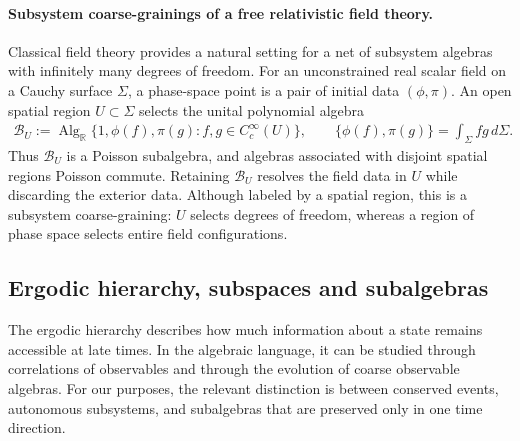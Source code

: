 \documentclass[a4paper,11pt]{article}
\theoremstyle{definition}
\theoremstyle{remark}
\begin{document}
\paragraph{Subsystem coarse-grainings of a free relativistic field theory.}
Classical field theory provides a natural setting for a net of subsystem algebras with
infinitely many degrees of freedom.  For an unconstrained real scalar field on a Cauchy
surface $\Sigma$, a phase-space point is a pair of initial data $(\phi,\pi)$.  An open
spatial region $U\subset\Sigma$ selects the unital polynomial algebra
\begin{align}
    \mathcal{B}_U
    :=\operatorname{Alg}_{\mathbb{R}}\{1,\phi(f),\pi(g):f,g\in C_c^\infty(U)\},
    \qquad
    \{\phi(f),\pi(g)\}=\int_\Sigma fg\,d\Sigma.
\end{align}
Thus $\mathcal{B}_U$ is a Poisson subalgebra, and algebras associated with disjoint
spatial regions Poisson commute.  Retaining $\mathcal{B}_U$ resolves the field data in
$U$ while discarding the exterior data.  Although labeled by a spatial region, this is
a subsystem coarse-graining: $U$ selects degrees of freedom, whereas a region of phase
space selects entire field configurations.
 
\subsection{Ergodic hierarchy, subspaces and subalgebras}%
\label{subsec:classical-ergodic-hierarchy}
 
The ergodic hierarchy describes how much information about a state remains accessible
at late times.  In the algebraic language, it can be studied through correlations of
observables and through the evolution of coarse observable algebras.  For our purposes,
the relevant distinction is between conserved events, autonomous subsystems, and
subalgebras that are preserved only in one time direction.
 
\end{document}
